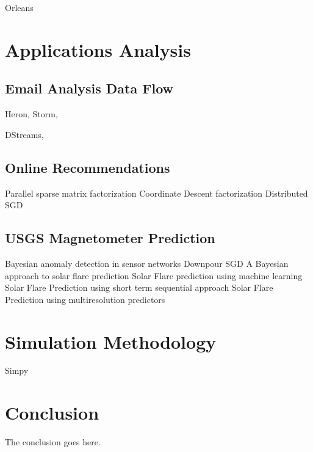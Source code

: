 \documentclass[conference]{IEEEtran}
\begin{document}
Orleans \cite{bernstein_orleans:_????}


\section{Applications Analysis}

\subsection{Email Analysis Data Flow}

Heron, \cite{kulkarni_twitter_2015}
Storm, \cite{toshniwal_storm_2014}

DStreams, \cite{zaharia_discretized_2012}


\subsection{Online Recommendations}

Parallel sparse matrix factorization \cite{gupta_highly_1997}
Coordinate Descent factorization \cite{yu_scalable_2012}
Distributed SGD \cite{gemulla_large-scale_2011}

\subsection{USGS Magnetometer Prediction}

Bayesian anomaly detection in sensor networks \cite{hill_real-time_2007}
Downpour SGD \cite{dean_large_2012}
A Bayesian approach to solar flare prediction \cite{wheatland_bayesian_2004}
Solar Flare prediction using machine learning \cite{qahwaji_automatic_2007}
Solar Flare Prediction using short term sequential approach \cite{yu_short-term_2009}
Solar Flare Prediction using multiresolution predictors \cite{yu_short-term_2010}


\cite{}

\section{Simulation Methodology}

Simpy \cite{matloff_introduction_2008}

\section{Conclusion}
The conclusion goes here.




\end{document}
